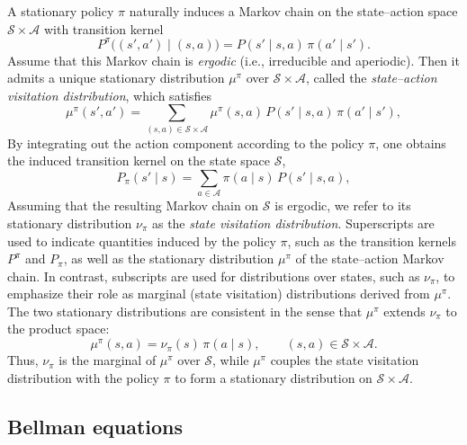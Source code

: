 \documentclass{article}
\numberwithin{equation}{section}
\newcommand{\cA}{\mathcal{A}}
\newcommand{\cS}{\mathcal{S}}
\def\mp{\mu^\pi}
\def\Pp{P^\pi}
\def\Ppp{P_\pi}
\begin{document}
A stationary policy $\pi$ naturally induces a Markov chain on the state--action space $\cS \times \cA$ with transition kernel
\begin{equation}\label{eq:p^pi_def}
    \Pp\bigl((s',a') \mid (s,a)\bigr)
    = P(s' \mid s,a)\,\pi(a' \mid s').
\end{equation}
Assume that this Markov chain is \emph{ergodic} (i.e., irreducible and aperiodic). Then it admits a unique stationary distribution $\mu^\pi$ over $\cS \times \cA$, called the \emph{state--action visitation distribution}, which satisfies
\begin{equation*}
    \mu^\pi(s',a') = \sum_{(s,a)\in \cS \times \cA} \mu^\pi(s,a)\, P(s' \mid s,a)\,\pi(a' \mid s'),
\end{equation*}
By integrating out the action component according to the policy $\pi$, one obtains the induced transition kernel on the state space $\mathcal{S}$,
\begin{equation}\label{eq:p_pi_def}
    \Ppp(s' \mid s) = \sum_{a \in \mathcal{A}} \pi(a \mid s)\, P(s' \mid s,a),
\end{equation}
Assuming that the resulting Markov chain on $\mathcal{S}$ is ergodic, we refer to its stationary distribution $\nu_\pi$ as the \emph{state visitation distribution}.
Superscripts are used to indicate quantities induced by the policy \(\pi\),
such as the transition kernels \(P^\pi\) and \(P_\pi\), as well as the
stationary distribution \(\mu^\pi\) of the state--action Markov chain.
In contrast, subscripts are used for distributions over states, such as
\(\nu_\pi\), to emphasize their role as marginal (state visitation) distributions
derived from \(\mu^\pi\).
The two stationary distributions are consistent in the sense that $\mp$ extends $\nu_\pi$ to the
product space:
\[
    \mp(s,a) = \nu_{\pi}(s)\,\pi(a \mid s),
    \qquad (s,a)\in \mathcal{S}\times\mathcal{A}.
\]
Thus, $\nu_\pi$ is the marginal of $\mp$ over $\mathcal{S}$, while $\mp$ couples the state visitation distribution with the policy $\pi$ to form a stationary distribution on $\mathcal{S}\times\mathcal{A}$.












\subsection{Bellman equations}
\end{document}

